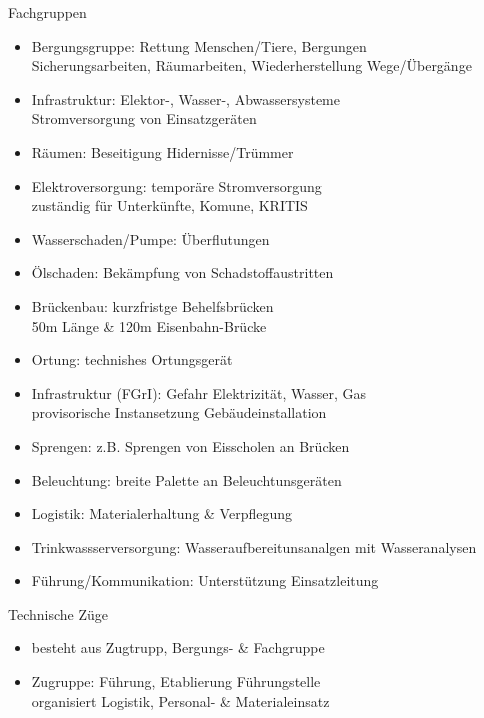 \begin{sectionbox}{Fachgruppen}
    \begin{itemize}
        \item Bergungsgruppe: Rettung Menschen/Tiere, Bergungen\\
        \ra Sicherungsarbeiten, Räumarbeiten, Wiederherstellung Wege/Übergänge
        \item Infrastruktur: Elektor-, Wasser-, Abwassersysteme\\
        \ra Stromversorgung von Einsatzgeräten
        \item Räumen: Beseitigung Hidernisse/Trümmer
        \item Elektroversorgung: temporäre Stromversorgung\\
        \ra zuständig für Unterkünfte, Komune, KRITIS
        \item Wasserschaden/Pumpe: Überflutungen
        \item Ölschaden: Bekämpfung von Schadstoffaustritten
        \item Brückenbau: kurzfristge Behelfsbrücken\\
        \ra 50m Länge \& 120m Eisenbahn-Brücke
        \item Ortung: technishes Ortungsgerät
        \item Infrastruktur (FGrI): Gefahr Elektrizität, Wasser, Gas\\
        \ra provisorische Instansetzung Gebäudeinstallation
        \item Sprengen: z.B. Sprengen von Eisscholen an Brücken
        \item Beleuchtung: breite Palette an Beleuchtunsgeräten
        \item Logistik: Materialerhaltung \& Verpflegung
        \item Trinkwassserversorgung: Wasseraufbereitunsanalgen mit Wasseranalysen
        \item Führung/Kommunikation: Unterstützung Einsatzleitung
    \end{itemize}
\end{sectionbox}
\begin{sectionbox}{Technische Züge}
    \begin{itemize}
        \item besteht aus Zugtrupp, Bergungs- \& Fachgruppe
        \item Zugruppe: Führung, Etablierung Führungstelle\\
        \ra organisiert Logistik, Personal- \& Materialeinsatz
    \end{itemize}
\end{sectionbox}
